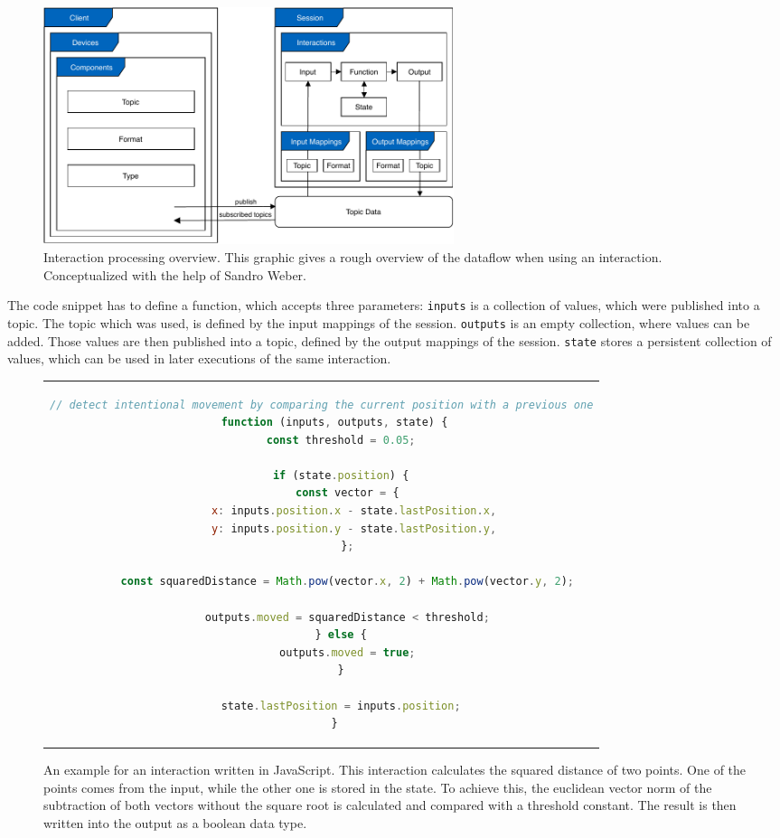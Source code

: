 \begin{figure}[htpb]
  \centering
  \includegraphics[width=12cm]{figures/ubii_cd.pdf}
  \caption[UBII Communication Diagram]{Interaction processing overview. This graphic gives a rough overview of the dataflow when using an interaction. Conceptualized with the help of Sandro Weber.}\label{fig:ubii_cd}
\end{figure}

The code snippet has to define a function, which accepts three parameters: 
\lstinline{inputs} is a collection of values, which were published into a topic. The topic which was used, is defined by the input mappings of the session. \lstinline{outputs} is an empty collection, where values can be added. Those values are then published into a topic, defined by the output mappings of the session. \lstinline{state} stores a persistent collection of values, which can be used in later executions of the same interaction.

\begin{figure}[htpb]
  \centering
  \begin{tabular}{c}
  \begin{lstlisting}[language=JavaScript]
    // detect intentional movement by comparing the current position with a previous one
    function (inputs, outputs, state) {
      const threshold = 0.05;

      if (state.position) {
        const vector = {
          x: inputs.position.x - state.lastPosition.x,
          y: inputs.position.y - state.lastPosition.y,
        };
  
        const squaredDistance = Math.pow(vector.x, 2) + Math.pow(vector.y, 2);
  
        outputs.moved = squaredDistance < threshold;
      } else {
        outputs.moved = true;
      }

      state.lastPosition = inputs.position;
    }
  \end{lstlisting}
  \end{tabular}
  \caption[A basic UBII interaction in JavaScript.]{An example for an interaction written in JavaScript. This interaction calculates the squared distance of two points. One of the points comes from the input, while the other one is stored in the state. To achieve this, the euclidean vector norm of the subtraction of both vectors without the square root is calculated and compared with a threshold constant. The result is then written into the output as a boolean data type.}\label{fig:ubii_interaction_example}
\end{figure}

